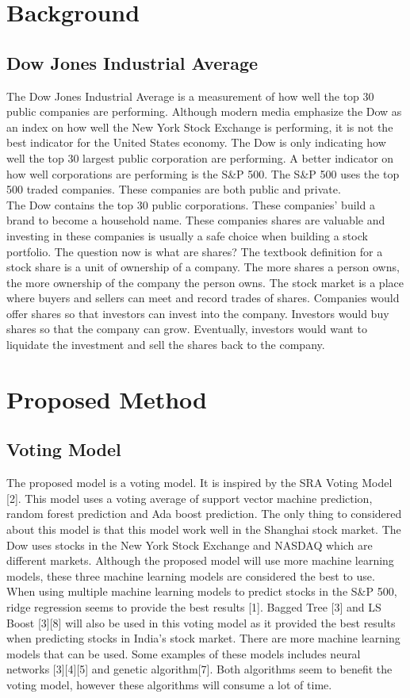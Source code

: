 \documentclass[journal]{IEEEtran}
\begin{document}
\section{Background}
\subsection{Dow Jones Industrial Average}
The Dow Jones Industrial Average is a measurement of how well the top 30 public companies are performing. Although modern media emphasize the Dow as an index on how well the New York Stock Exchange is performing, it is not the best indicator for the United States economy. The Dow is only indicating how well the top 30 largest public corporation are performing. A better indicator on how well corporations are performing is the S\&P 500. The S\&P 500 uses the top 500 traded companies. These companies are both public and private. \\

The Dow contains the top 30 public corporations. These companies' build a brand to become a household name. These companies shares are valuable and investing in these companies is usually a safe choice when building a stock portfolio. The question now is what are shares? The textbook definition for a stock share is a unit of ownership of a company. The more shares a person owns, the more ownership of the company the person owns. The stock market is a place where buyers and sellers can meet and record trades of shares. Companies would offer shares so that investors can invest into the company. Investors would buy shares so that the company can grow. Eventually, investors would want to liquidate the investment and sell the shares back to the company.

\section{Proposed Method}
\subsection{Voting Model}
The proposed model is a voting model. It is inspired by the SRA Voting Model [2]. This model uses a voting average of support vector machine prediction, random forest prediction and Ada boost prediction. The only thing to considered about this model is that this model work well in the Shanghai stock market. The Dow uses stocks in the New York Stock Exchange and NASDAQ which are different markets. Although the proposed model will use more machine learning models, these three machine learning models are considered the best to use. When using multiple machine learning models to predict stocks in the S\&P 500, ridge regression seems to provide the best results [1]. Bagged Tree [3] and LS Boost [3][8] will also be used in this voting model as it provided the best results when predicting stocks in India's stock market. There are more machine learning models that can be used. Some examples of these models includes neural networks [3][4][5] and genetic algorithm[7]. Both algorithms seem to benefit the voting model, however these algorithms will consume a lot of time. \\
\end{document}
